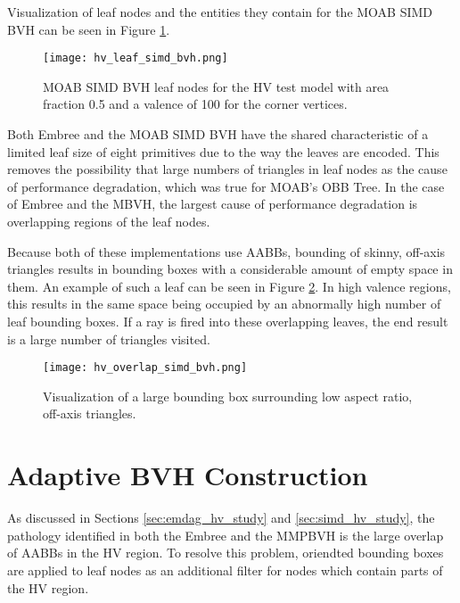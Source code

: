 Visualization of leaf nodes and the entities they contain for the MOAB SIMD BVH
can be seen in Figure \ref{fig:hv_leaf_simd_bvh}.

  \begin{figure}
    \texttt{[image: hv\_leaf\_simd\_bvh.png]}
    \caption{MOAB SIMD BVH leaf nodes for the HV test model with area fraction
      0.5 and a valence of 100 for the corner vertices.}
    \label{fig:hv_leaf_simd_bvh}
  \end{figure}
  
Both Embree and the MOAB SIMD BVH have the shared characteristic of a limited
leaf size of eight primitives due to the way the leaves are encoded. This
removes the possibility that large numbers of triangles in leaf nodes as the
cause of performance degradation, which was true for MOAB's OBB Tree. In the case
of Embree and the MBVH, the largest cause of performance degradation is
overlapping regions of the leaf nodes.

Because both of these implementations use AABBs, bounding of skinny, off-axis
triangles results in bounding boxes with a considerable amount of empty space in
them. An example of such a leaf can be seen in Figure
\ref{fig:hv_overlap_simd_bvh}. In high valence regions, this results in the
same space being occupied by an abnormally high number of leaf bounding
boxes. If a ray is fired into these overlapping leaves, the end result is a
large number of triangles visited.

\begin{figure}
  \texttt{[image: hv\_overlap\_simd\_bvh.png]}
  \caption{Visualization of a large bounding box surrounding low aspect ratio, off-axis triangles.}
  \label{fig:hv_overlap_simd_bvh}
\end{figure}

\section{Adaptive BVH Construction}

As discussed in Sections \ref{sec:emdag_hv_study} and \ref{sec:simd_hv_study},
the pathology identified in both the Embree and the MMPBVH is the large overlap
of AABBs in the HV region. To resolve this problem, oriendted bounding boxes are
applied to leaf nodes as an additional filter for nodes which contain parts of
the HV region.  
